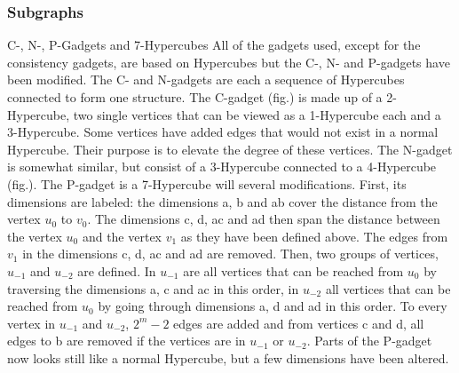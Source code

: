 \documentclass[12pt,a4paper]{article}
\begin{document}
\subsubsection{Subgraphs}

C-, N-, P-Gadgets and 7-Hypercubes
All of the gadgets used, except for the consistency gadgets, are based on Hypercubes but the C-, N- and P-gadgets have been modified. The C- and N-gadgets are each a sequence of Hypercubes connected to form one structure. The C-gadget (fig.) is made up of a 2-Hypercube, two single vertices that can be viewed as a 1-Hypercube each and a 3-Hypercube. Some vertices have added edges that would not exist in a normal Hypercube. Their purpose is to elevate the degree of these vertices. The N-gadget is somewhat similar, but consist of a 3-Hypercube connected to a 4-Hypercube (fig.). The P-gadget is a 7-Hypercube will several modifications. First, its dimensions are labeled: the dimensions a, b and ab cover the distance from the vertex $u_0$ to $v_0$. The dimensions c, d, ac and ad then span the distance between the vertex $u_0$ and the vertex $v_1$ as they have been defined above. The edges from $v_1$ in the dimensions c, d, ac and ad are removed. Then, two groups of vertices, $u_{-1}$ and $u_{-2}$ are defined. In  $u_{-1}$ are all vertices that can be reached from $u_0$ by traversing the dimensions a, c and ac in this order, in $u_{-2}$ all vertices that can be reached from $u_0$ by going through dimensions a, d and ad in this order. To every vertex in $u_{-1}$ and $u_{-2}$, $2^m-2$ edges are added and from vertices c and d, all edges to b are removed if the vertices are in $u_{-1}$ or $u_{-2}$. Parts of the P-gadget now looks still like a normal Hypercube, but a few dimensions have been altered. 
\newline
\end{document}
